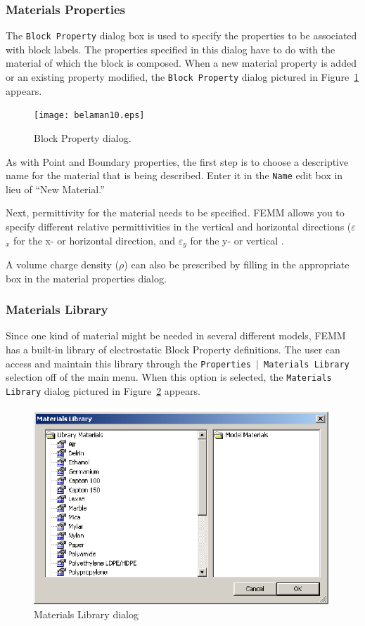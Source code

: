 \documentclass[12pt]{report}
\begin{document}
\subsubsection{Materials Properties}

The \texttt{Block Property} dialog box is used to specify the
properties to be associated with block labels. The properties
specified in this dialog have to do with the material of which the
block is composed. When a new material property is added or an
existing property modified, the
\texttt{Block Property} dialog pictured in Figure~\ref{fig10} appears.

\begin{figure}[htbp]
\centerline{\texttt{[image: belaman10.eps]}}
\caption{Block Property dialog.}
\label{fig10}
\end{figure}

As with Point and Boundary properties, the first step is to choose a
descriptive name for the material that is being described. Enter it in the
\texttt{Name} edit box in lieu of ``New Material.''

Next, permittivity for the material needs to be specified. FEMM allows you
to specify different relative permittivities in the vertical and horizontal
directions (\textit{$\varepsilon $}$_{x}$ for the x- or horizontal direction, and \textit{$\varepsilon $}$_{y}$ for the y-
or vertical .

A volume charge density (\textit{$\rho $}) can also be prescribed by filling in the
appropriate box in the material properties dialog.


\subsubsection{Materials Library}

Since one kind of material might be needed in several different
models, FEMM has a built-in library of electrostatic Block Property definitions.
The user can access and maintain this library through the
\texttt{Properties $\vert $ Materials Library} selection off of the
main menu. When this option is selected, the
\texttt{Materials Library} dialog pictured in Figure~\ref{fig11} appears.

\begin{figure}[htbp]
\centerline{\includegraphics{bd_matlib.ps}}
\caption{Materials Library dialog}
\label{fig11}
\end{figure}
\end{document}
